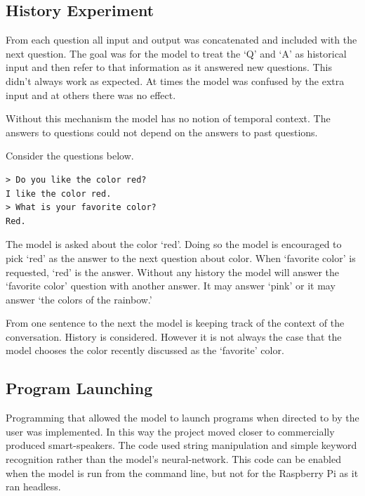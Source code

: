 \subsection{History Experiment}
From each question all input and output was concatenated and included with the next question. The goal was for the model to treat the `Q' and `A' as historical input and then refer to that information as it answered new questions. This didn't always work as expected. At times the model was confused by the extra input and at others there was no effect. 

Without this mechanism the model has no notion of temporal context. The answers to questions could not depend on the answers to past questions. %

Consider the questions below.
\begin{verbatim}
> Do you like the color red?
I like the color red.
> What is your favorite color?
Red.
\end{verbatim}

\label{install-gpt2-history}

The model is asked about the color `red'. Doing so the model is encouraged to pick `red' as the answer to the next question about color. When `favorite color' is requested, `red' is the answer. Without any history the model will answer the `favorite color' question with another answer. It may answer `pink' or it may answer `the colors of the rainbow.' 

From one sentence to the next the model is keeping track of the context of the conversation. History is considered. However it is not always the case that the model chooses the color recently discussed as the `favorite' color.



\subsection{Program Launching}

Programming that allowed the model to launch programs when directed to by the user was implemented. In this way the project moved closer to commercially produced smart-speakers. The code used string manipulation and simple keyword recognition rather than the model's neural-network. This code can be enabled when the model is run from the command line, but not for the Raspberry Pi as it ran headless.

